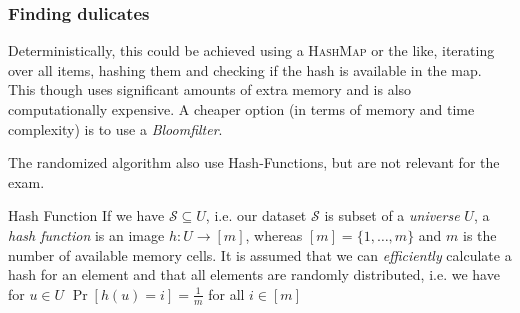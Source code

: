 \subsubsection{Finding dulicates}
Deterministically, this could be achieved using a \textsc{HashMap} or the like, iterating over all items, hashing them and checking if the hash is available in the map.
This though uses significant amounts of extra memory and is also computationally expensive.
A cheaper option (in terms of memory and time complexity) is to use a \textit{Bloomfilter}.

The randomized algorithm also use Hash-Functions, but are not relevant for the exam.

\begin{definition}[]{Hash Function}
    If we have $\mathcal{S} \subseteq U$, i.e. our dataset $\mathcal{S}$ is subset of a \textit{universe} $U$, a \textit{hash function} is an image $h: U \rightarrow [m]$, whereas $[m] = \{1, \ldots, m\}$ and $m$ is the number of available memory cells. It is assumed that we can \textit{efficiently} calculate a hash for an element and that all elements are randomly distributed, i.e. we have for $u \in U$ $\Pr[h(u) = i] = \frac{1}{m}$ for all $i \in [m]$
\end{definition}
